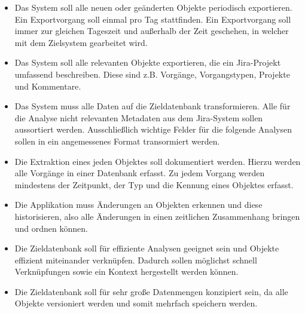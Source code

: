 \begin{itemize}
  \item Das System soll alle neuen oder geänderten Objekte periodisch exportieren. Ein Exportvorgang soll einmal pro Tag stattfinden. Ein Exportvorgang soll immer zur gleichen Tageszeit und außerhalb der Zeit geschehen, in welcher mit dem Zielsystem gearbeitet wird.
  \item Das System soll alle relevanten Objekte exportieren, die ein Jira-Projekt umfassend beschreiben. Diese sind z.B. Vorgänge, Vorgangstypen, Projekte und Kommentare.
  \item Das System muss alle Daten auf die Zieldatenbank transformieren. Alle für die Analyse nicht relevanten Metadaten aus dem Jira-System sollen aussortiert werden. Ausschließlich wichtige Felder für die folgende Analysen sollen in ein angemessenes Format transormiert werden.
  \item Die Extraktion eines jeden Objektes soll dokumentiert werden. Hierzu werden alle Vorgänge in einer Datenbank erfasst. Zu jedem Vorgang werden mindestens der Zeitpunkt, der Typ und die Kennung eines Objektes erfasst.
  \item Die Applikation muss Änderungen an Objekten erkennen und diese historisieren, also alle Änderungen in einen zeitlichen Zusammenhang bringen und ordnen können.
  \item Die Zieldatenbank soll für effiziente Analysen geeignet sein und Objekte effizient miteinander verknüpfen. Dadurch sollen möglichst schnell Verknüpfungen sowie ein Kontext hergestellt werden können.
  \item Die Zieldatenbank soll für sehr große Datenmengen konzipiert sein, da alle Objekte versioniert werden und somit mehrfach speichern werden.
\end{itemize}
